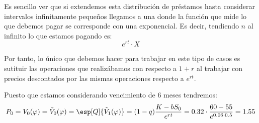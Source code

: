 \begin{problem}[1]
Es sencillo ver que si extendemos esta distribución de préstamos hasta considerar intervalos infinitamente pequeños llegamos a una  donde la función que mide lo que debemos pagar se corresponde con una exponencial. Es decir, tendiendo $n$ al infinito lo que estamos pagando es:
\[e^{rt}\cdot X\]

Por tanto, lo único que debemos hacer para trabajar en este tipo de casos es sutituir las operaciones que realizábamos con respecto a $1+r$ al trabajar con precios descontados por las mismas operaciones respecto a $e^{rt}$.

Puesto que estamos considerando vencimiento de 6 meses tendremos:
\[P_0 = V_0(\varphi) = \tilde{V}_0(\varphi) = \esp[Q]{\tilde{V}_1(\varphi)} = (1-q) \frac{K-bS_0}{e^{rt}} = 0.32 \cdot \frac{60-55}{e^{0.06\cdot 0.5}}=1.55\]
\end{problem}

